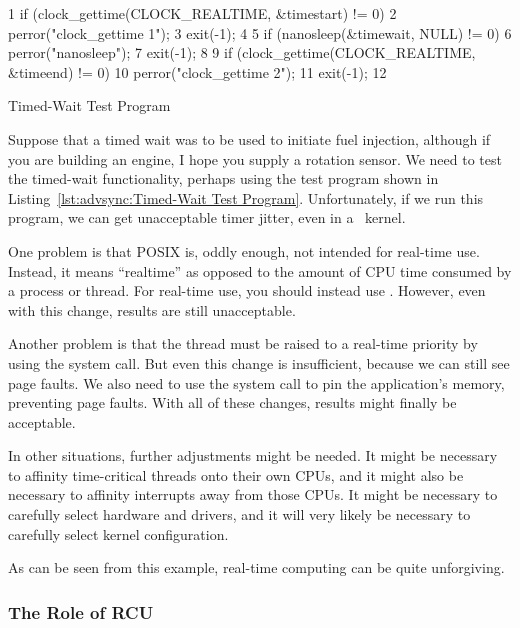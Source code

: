 \begin{listing}[tb]
{ \scriptsize
\begin{verbbox}
 1 if (clock_gettime(CLOCK_REALTIME, &timestart) != 0) {
 2   perror("clock_gettime 1");
 3   exit(-1);
 4 }
 5 if (nanosleep(&timewait, NULL) != 0) {
 6   perror("nanosleep");
 7   exit(-1);
 8 }
 9 if (clock_gettime(CLOCK_REALTIME, &timeend) != 0) {
10   perror("clock_gettime 2");
11   exit(-1);
12 }
\end{verbbox}
}
\centering
\theverbbox
\caption{Timed-Wait Test Program}
\label{lst:advsync:Timed-Wait Test Program}
\end{listing}

Suppose that a timed wait was to be used to initiate fuel injection,
although if you are building an engine, I hope you supply a rotation
sensor.
We need to test the timed-wait functionality, perhaps using the test program
shown in
Listing~\ref{lst:advsync:Timed-Wait Test Program}.
Unfortunately, if we run this program, we can get unacceptable timer
jitter, even in a \rt\ kernel.

One problem is that POSIX  is, oddly enough, not intended
for real-time use.
Instead, it means ``realtime'' as opposed to the amount of CPU time
consumed by a process or thread.
For real-time use, you should instead use .
However, even with this change, results are still unacceptable.

Another problem is that the thread must be raised to a real-time
priority by using the  system call.
But even this change is insufficient, because we can still see
page faults.
We also need to use the  system call to pin the
application's memory, preventing page faults.
With all of these changes, results might finally be acceptable.

In other situations, further adjustments might be needed.
It might be necessary to affinity time-critical threads onto their
own CPUs, and it might also be necessary to affinity interrupts
away from those CPUs.
It might be necessary to carefully select hardware and drivers,
and it will very likely be necessary to carefully select kernel
configuration.

As can be seen from this example, real-time computing can be quite
unforgiving.

\subsubsection{The Role of RCU}
\label{sec:advsync:The Role of RCU}

